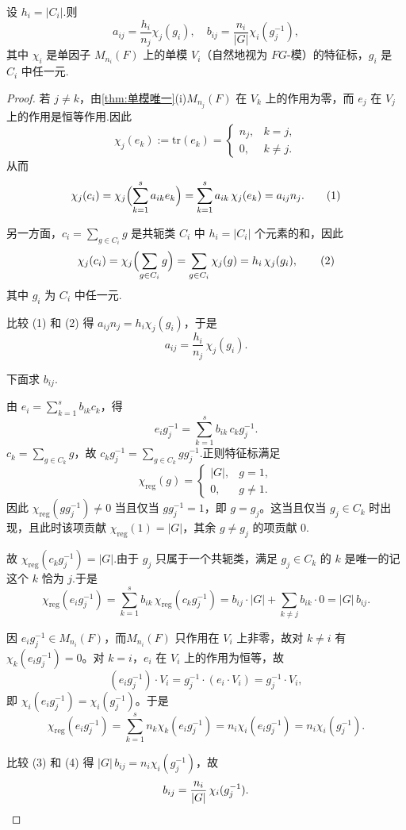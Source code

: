 \begin{proposition}
设 $h_i = |C_i|$.则
$$
a_{ij} = \frac{h_i}{n_j} \chi_j(g_i), \quad b_{ij} = \frac{n_i}{|G|} \chi_i(g_j^{-1}),
$$
其中 $\chi_i$ 是单因子 $M_{n_i}(F)$ 上的单模 $V_i$（自然地视为 $FG$-模）的特征标，$g_i$ 是 $C_i$ 中任一元.
\end{proposition}

\begin{proof}
若 $j \neq k$，由\cref{thm:单模唯一}(i)$M_{n_j}(F)$ 在 $V_k$ 上的作用为零，而 $e_j$ 在 $V_j$ 上的作用是恒等作用.因此
$$
\chi_j(e_k) := \mathrm{tr}(e_k) = \begin{cases}
n_j, & k = j, \\
0, & k \neq j.
\end{cases}
$$
从而
\[
\chi_j(c_i) = \chi_j \Bigl( \sum_{k=1}^s a_{ik}e_k \Bigr) = \sum_{k=1}^s a_{ik}\, \chi_j(e_k) = a_{ij}n_j. \tag{1}
\]

另一方面，$c_i = \sum_{g \in C_i} g$ 是共轭类 $C_i$ 中 $h_i = |C_i|$ 个元素的和，因此
\[
\chi_j(c_i) = \chi_j\Bigl(\sum_{g \in C_i} g\Bigr) = \sum_{g \in C_i} \chi_j(g) = h_i\, \chi_j(g_i), \tag{2}
\]
其中 $g_i$ 为 $C_i$ 中任一元.\par
比较 (1) 和 (2) 得 $a_{ij} n_j = h_i \chi_j(g_i)$，于是
\[
a_{ij} = \frac{h_i}{n_j}\,\chi_j(g_i).
\]

下面求 $b_{ij}$.\par
\noindent{} 由 $e_i = \sum_{k=1}^s b_{ik} c_k$，得
\[
e_i g_j^{-1} = \sum_{k=1}^s b_{ik}\, c_k g_j^{-1}.
\]
$c_k = \sum_{g \in C_k} g$，故 $c_k g_j^{-1} = \sum_{g \in C_k} g g_j^{-1}$.正则特征标满足
\[
\chi_{\mathrm{reg}}(g) = \begin{cases} |G|, & g = 1, \\ 0, & g \neq 1. \end{cases}
\]
因此 $\chi_{\mathrm{reg}}(g g_j^{-1}) \neq 0$ 当且仅当 $g g_j^{-1} = 1$，即 $g = g_j$。这当且仅当 $g_j \in C_k$ 时出现，且此时该项贡献 $\chi_{\mathrm{reg}}(1) = |G|$，其余 $g \neq g_j$ 的项贡献 $0$.\par
故 $\chi_{\mathrm{reg}}(c_k g_j^{-1}) = |G|$.由于 $g_j$ 只属于一个共轭类，满足 $g_j \in C_k$ 的 $k$ 是唯一的记这个 $k$ 恰为 $j$.于是
\[
\chi_{\mathrm{reg}}(e_i g_j^{-1})
= \sum_{k=1}^s b_{ik}\, \chi_{\mathrm{reg}}(c_k g_j^{-1})
= b_{ij} \cdot |G| + \sum_{k \neq j} b_{ik} \cdot 0
= |G|\, b_{ij}. \tag{3}
\]

\noindent{} 因 $e_i g_j^{-1} \in M_{n_i}(F)$，而$M_{n_i}(F)$ 只作用在 $V_i$ 上非零，故对 $k \neq i$ 有 $\chi_k(e_i g_j^{-1}) = 0$。对 $k = i$，$e_i$ 在 $V_i$ 上的作用为恒等，故
\[
(e_i g_j^{-1}) \cdot V_i = g_j^{-1} \cdot (e_i \cdot V_i) = g_j^{-1} \cdot V_i,
\]
即 $\chi_i(e_i g_j^{-1}) = \chi_i(g_j^{-1})$。于是
\[
\chi_{\mathrm{reg}}(e_i g_j^{-1})
= \sum_{k=1}^s n_k \chi_k(e_i g_j^{-1})
= n_i \chi_i(e_i g_j^{-1})
= n_i \chi_i(g_j^{-1}). \tag{4}
\]

比较 (3) 和 (4) 得 $|G|\, b_{ij} = n_i \chi_i(g_j^{-1})$，故
\begin{equation*}
b_{ij} = \frac{n_i}{|G|}\,\chi_i(g_j^{-1}). \qedhere
\end{equation*}
\end{proof}

